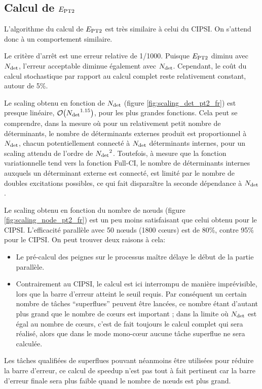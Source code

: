 \documentclass[./thesis.tex]{subfiles}
\begin{document}
\subsection{Calcul de $E_\text{PT2}$}

L’algorithme du calcul de $E_\text{PT2}$ est très similaire à celui du CIPSI. On s'attend donc à un comportement similaire.

Le critère d'arrêt est une erreur relative de 1/1000. Puisque $E_\text{PT2}$ diminu avec ${N_\text{det}}$, l'erreur acceptable diminue également avec ${N_\text{det}}$. Cependant, le coût du calcul stochastique par rapport au calcul complet reste relativement constant, autour de 5\%.

Le scaling obtenu en fonction de ${N_\text{det}}$ (figure \ref{fig:scaling_det_pt2_fr}) est presque linéaire, $\order{\Ndet^{1.15}}$, pour les plus grandes fonctions. Cela peut se comprendre, dans la mesure où pour un relativement petit nombre de déterminants, le nombre de déterminants externes produit est proportionnel à ${N_\text{det}}$, chacun potentiellement connecté à ${N_\text{det}}$ déterminants internes, pour un scaling attendu de l'ordre de ${N_\text{det}}^2$. Toutefois, à mesure que la fonction variationnelle tend vers la fonction Full-CI, le nombre de déterminants internes auxquels un déterminant externe est connecté, est limité par le nombre de doubles excitations possibles, ce qui fait disparaître la seconde dépendance à ${N_\text{det}}$.

Le scaling obtenu en fonction du nombre de nœuds (figure \ref{fig:scaling_node_pt2_fr}) est un peu moins satisfaisant que celui obtenu pour le CIPSI. L'efficacité parallèle avec 50 nœuds (1800 cœurs) est de 80\%, contre 95\% pour le CIPSI. On peut trouver deux raisons à cela:
\begin{itemize}
\item
Le pré-calcul des peignes sur le processus maître délaye le début de la partie parallèle.
\item
Contrairement au CIPSI, le calcul est ici interrompu de manière imprévisible, lors que la barre d'erreur atteint le seuil requis. Par conséquent un certain nombre de tâches ``superflues'' peuvent être lancées, ce nombre étant d'autant plus grand que le nombre de cœurs est important ; dans la limite où ${N_\text{det}}$ est égal au nombre de cœurs, c'est de fait toujours le calcul complet qui sera réalisé, alors que dans le mode mono-cœur aucune tâche superflue ne sera calculée.
\end{itemize}

Les tâches qualifiées de superflues pouvant néanmoins être utilisées pour réduire la barre d'erreur, ce calcul de speedup n'est pas tout à fait pertinent car la barre d'erreur finale sera plus faible quand le nombre de nœuds est plus grand.
\end{document}
